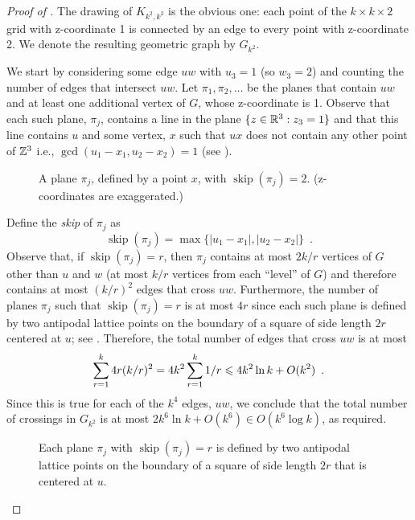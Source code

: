 \documentclass[12pt]{article}
\DeclareMathOperator{\skp}{skip}
\begin{document}
\begin{proof}[Proof of ]
  The drawing of $K_{k^2,k^2}$ is the obvious one: each point of the
  $k\times k\times2$ grid with z-coordinate 1 is connected by an edge
  to every point with z-coordinate 2.  We denote the resulting
  geometric graph by $G_{k^2}$.

  We start by considering some edge $uw$ with $u_3=1$ (so
  $w_3=2$) and counting the number of edges that intersect $uw$.
  Let $\pi_1,\pi_2,\ldots$ be the planes that contain $uw$ and at least
  one additional vertex of $G$, whose z-coordinate is 1.
  Observe that each such plane, $\pi_j$, contains a line in the plane
  $\{z\in\mathbb{R}^3: z_3=1\}$ and that this line contains $u$ and some vertex,
  $x$ such that $ux$ does not contain any other point of $\mathbb{Z}^3$ i.e.,
  $\gcd(u_1-x_1,u_2-x_2)=1$ (see ).
  \begin{figure}
    \caption{A plane $\pi_j$, defined by a point $x$, with
      $\skp(\pi_j)=2$. (z-coordinates are exaggerated.)}
  \end{figure}
  Define the \emph{skip} of $\pi_j$ as
  \[
     \skp(\pi_j)=\max\{|u_1-x_1|,|u_2-x_2|\} \enspace .
  \]
  Observe that, if $\skp(\pi_j)=r$, then $\pi_j$ contains at most $2k/r$
  vertices of $G$ other than $u$ and $w$ (at most $k/r$ vertices from
  each ``level'' of $G$) and therefore contains at most $(k/r)^2$
  edges that cross $uw$.  Furthermore, the number of planes $\pi_j$
  such that $\skp(\pi_j)=r$ is at most $4r$ since each such plane is
  defined by two antipodal lattice points on the boundary of a square of
  side length $2r$ centered at $u$; see .  Therefore,
  the total number of edges that cross $uw$ is at most
  \begin{equation}
     \sum_{r=1}^k 4r(k/r)^2 = 4k^2\sum_{r=1}^k 1/r 
       \le 4k^2\ln k + O(k^2) \enspace .
        \eqlabel{critical}
  \end{equation}
  Since this is true for each of the $k^4$ edges, $uw$, we conclude
  that the total number of crossings in $G_{k^2}$ is at most $2k^6\ln
  k+O(k^6)\in O(k^6\log k)$, as required.
  \begin{figure}
    \caption{Each plane $\pi_j$ with $\skp(\pi_j)=r$ is defined by two
      antipodal lattice points on the boundary of a square of side length
      $2r$ that is centered at $u$.}
  \end{figure}
\end{proof}
\end{document}
